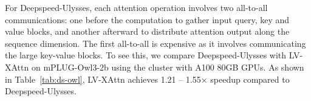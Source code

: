 
For Deepspeed-Ulysses, each attention operation involves two all-to-all communications: one before the computation to gather input query, key and value blocks, and another afterward to distribute attention output along the sequence dimension. The first all-to-all is expensive as it involves communicating the large key-value blocks. To see this, we compare Deepspeed-Ulysses with LV-XAttn on mPLUG-Owl3-2b using the cluster with A100 80GB GPUs. As shown in Table~\ref{tab:ds-owl}, LV-XAttn achieves 1.21 -- 1.55$\times$ speedup compared to Deepspeed-Ulysses.

